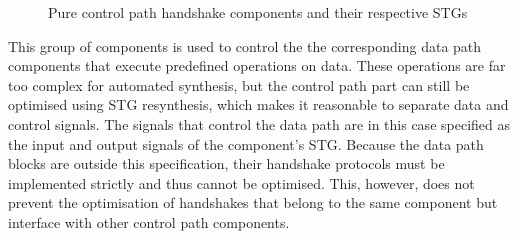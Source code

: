 \begin{figure}

\caption{Pure control path handshake components and their respective STGs}
\end{figure}


This group of components is used to control the the corresponding
data path components that execute predefined operations on data. These
operations are far too complex for automated synthesis, but the control
path part can still be optimised using STG resynthesis, which makes
it reasonable to separate data and control signals. The signals that
control the data path are in this case specified as the input and
output signals of the component's STG. Because the data path blocks
are outside this specification, their handshake protocols must be
implemented strictly and thus cannot be optimised. This, however,
does not prevent the optimisation of handshakes that belong to the
same component but interface with other control path components.

